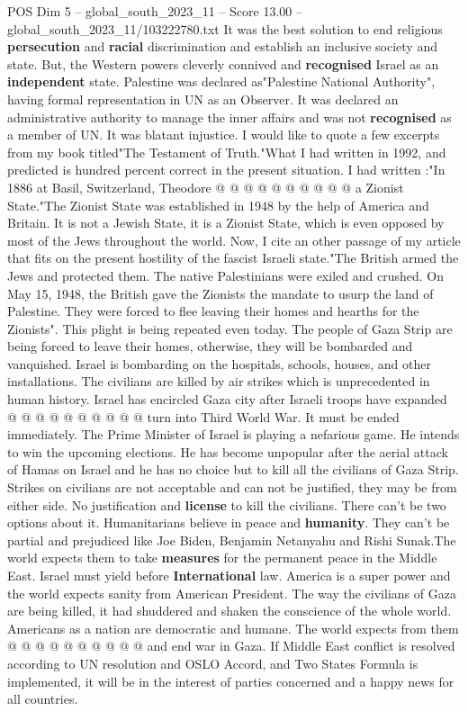 \begin{textsample}{POS Dim 5 – global\_south\_2023\_11 – Score 13.00 – global\_south\_2023\_11/103222780.txt}
It was the best solution to end religious \textbf{persecution} and \textbf{racial} discrimination and establish an inclusive society and state.
But, the Western powers cleverly connived and \textbf{recognised} Israel as an \textbf{independent} state.
Palestine was declared as"Palestine National Authority", having formal representation in UN as an Observer.
It was declared an administrative authority to manage the inner affairs and was not \textbf{recognised} as a member of UN.
It was blatant injustice.
I would like to quote a few excerpts from my book titled"The Testament of Truth."What I had written in 1992, and predicted is hundred percent correct in the present situation.
I had written :"In 1886 at Basil, Switzerland, Theodore @ @ @ @ @ @ @ @ @ @ a Zionist State."The Zionist State was established in 1948 by the help of America and Britain.
It is not a Jewish State, it is a Zionist State, which is even opposed by most of the Jews throughout the world.
Now, I cite an other passage of my article that fits on the present hostility of the fascist Israeli state."The British armed the Jews and protected them.
The native Palestinians were exiled and crushed.
On May 15, 1948, the British gave the Zionists the mandate to usurp the land of Palestine.
They were forced to flee leaving their homes and hearths for the Zionists".
This plight is being repeated even today.
The people of Gaza Strip are being forced to leave their homes, otherwise, they will be bombarded and vanquished.
Israel is bombarding on the hospitals, schools, houses, and other installations.
The civilians are killed by air strikes which is unprecedented in human history.
Israel has encircled Gaza city after Israeli troops have expanded @ @ @ @ @ @ @ @ @ @ turn into Third World War.
It must be ended immediately.
The Prime Minister of Israel is playing a nefarious game.
He intends to win the upcoming elections.
He has become unpopular after the aerial attack of Hamas on Israel and he has no choice but to kill all the civilians of Gaza Strip.
Strikes on civilians are not acceptable and can not be justified, they may be from either side.
No justification and \textbf{license} to kill the civilians.
There can't be two options about it.
Humanitarians believe in peace and \textbf{humanity}.
They can't be partial and prejudiced like Joe Biden, Benjamin Netanyahu and Rishi Sunak.The world expects them to take \textbf{measures} for the permanent peace in the Middle East.
Israel must yield before \textbf{International} law.
America is a super power and the world expects sanity from American President.
The way the civilians of Gaza are being killed, it had shuddered and shaken the conscience of the whole world.
Americans as a nation are democratic and humane.
The world expects from them @ @ @ @ @ @ @ @ @ @ and end war in Gaza.
If Middle East conflict is resolved according to UN resolution and OSLO Accord, and Two States Formula is implemented, it will be in the interest of parties concerned and a happy news for all countries.

\end{textsample}
